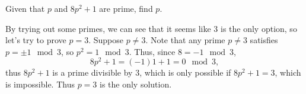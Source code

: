 \documentclass[11pt,dvipsnames]{book}
\numberwithin{equation}{section} %
\numberwithin{figure}{section} %
\numberwithin{table}{section} %
\begin{document}
\begin{exercise} Given that $p$ and $8p^2+1$ are prime, find $p$. 

\begin{solution}
By trying out some primes, we can see that it seems like $3$ is the only option, so let's try to prove $p=3$. Suppose $p\neq 3$. Note that any prime $p\neq 3$ satisfies $p = \pm 1 \mod 3$, so $p^2  = 1 \mod 3$. Thus, since $8 = -1\mod 3$, 
\[
8p^2+1 = (-1)1+1=0\mod 3,\]
thus $8p^2+1$ is a prime divisible by 3, which is only possible if $8p^2+1=3$, which is impossible. Thus $p=3$ is the only solution.
\end{solution}


\end{exercise}

%
%
%
%
%
%
%
\end{document}
